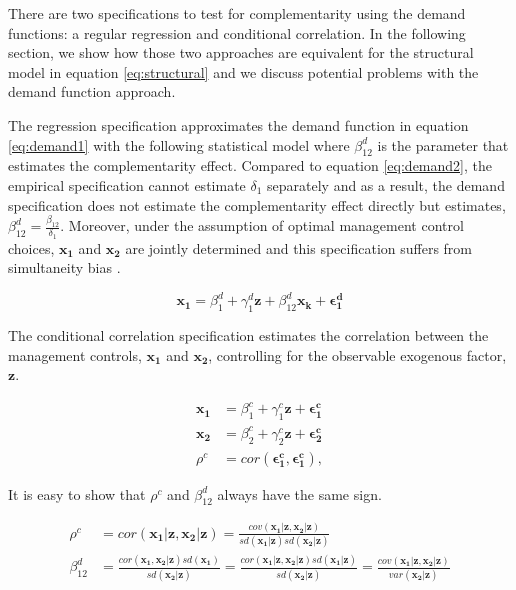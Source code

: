 \documentclass[12pt]{article}
\begin{document}
There are two specifications to test for complementarity using the
demand functions: a regular regression and conditional correlation. In
the following section, we show how those two approaches are equivalent
for the structural model in equation \eqref{eq:structural} and we
discuss potential problems with the demand function approach.

The regression specification approximates the demand function in
equation \eqref{eq:demand1} with the following statistical model where
\(\beta^d_{12}\) is the parameter that estimates the complementarity
effect. Compared to equation \eqref{eq:demand2}, the empirical
specification cannot estimate \(\delta_1\) separately and as a result,
the demand specification does not estimate the complementarity effect
directly but estimates, \(\beta^d_{12} = \frac{\beta_{12}}{\delta_1}\).
Moreover, under the assumption of optimal management control choices,
\(\mathbf{x_1}\) and \(\mathbf{x_2}\) are jointly determined and this
specification suffers from simultaneity bias \citep{Chenhall2007}.

\[
\mathbf{x_1} = \beta_1^d + \gamma_1^d \mathbf{z} + \beta_{12}^d \mathbf{x_k}
  + \mathbf{\epsilon^d_1}
\]

The conditional correlation specification estimates the correlation
between the management controls, \(\mathbf{x_1}\) and \(\mathbf{x_2}\),
controlling for the observable exogenous factor, \(\mathbf{z}\).

\begin{align*}
\mathbf{x_1} &= \beta_1^c + \gamma_1^c \mathbf{z} + \mathbf{\epsilon^c_1} \\
\mathbf{x_2} &= \beta_2^c + \gamma_2^c \mathbf{z} + \mathbf{\epsilon^c_2} \\
\rho^c &= cor(\mathbf{\epsilon^c_1}, \mathbf{\epsilon^c_1}),
\end{align*}

It is easy to show that \(\rho^c\) and \(\beta^d_{12}\) always have the
same sign.

\begin{align}\label{eq:coefficient}
\rho^c &= cor(\mathbf{x_1}|\mathbf{z}, \mathbf{x_2}|\mathbf{z}) =
\frac{
      cov(\mathbf{x_1}|\mathbf{z},\mathbf{x_2}|\mathbf{z})
      }{
      sd(\mathbf{x_1}|\mathbf{z}) sd(\mathbf{x_2}|\mathbf{z})
      } \nonumber \\
\beta^d_{12} &=
\frac{
      cor(\mathbf{x_1}, \mathbf{x_2}|\mathbf{z}) sd(\mathbf{x_1})
      }{
      sd(\mathbf{x_2} | \mathbf{z})
      }
      =
 \frac{
      cor(\mathbf{x_1}|\mathbf{z}, \mathbf{x_2}|\mathbf{z})
      sd(\mathbf{x_1} | \mathbf{z})
      }{
      sd(\mathbf{x_2} | \mathbf{z})
      }
      =
\frac{
     cov(\mathbf{x_1}|\mathbf{z}, \mathbf{x_2}|\mathbf{z})
     }{
     var(\mathbf{x_2} | \mathbf{z})
     }
\end{align}
\end{document}
